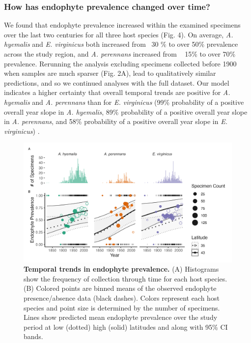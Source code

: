 \documentclass[11pt]{article}
\begin{document}
\subsubsection*{How has endophyte prevalence changed over time?}
We found that endophyte prevalence increased within the examined specimens over the last two centuries for all three host species (Fig. 4). 
On average, \emph{A. hyemalis} and \emph{E. virginicus} both increased from ~30 \% to over 50\% prevalence across the study region, and \emph{A. perennans} increased from ~ 15\% to over 70\% prevalence.
Rerunning the analysis excluding specimens collected before 1900 when samples are much sparser (Fig. 2A), lead to qualitatively similar predictions, and so we continued analyses with the full dataset. 
Our model indicates a higher certainty that overall temporal trends are positive for \emph{A. hyemalis} and \emph{A. perennans} than for \emph{E. virginicus} (99\% probability of a positive overall year slope in \emph{A. hyemalis}, 89\% probability of a positive overall year slope in \emph{A. perennans}, and 58\% probability of a positive overall year slope in \emph{E. virginicus}) .

\begin{figure}[H]
	\centering
	\includegraphics[width = \linewidth]{year_plot.png}
	\caption{\textbf{Temporal trends in endophyte prevalence.} (A) Histograms show the frequency of collection through time for each host species. (B) Colored points are binned means of the observed endophyte presence/absence data (black dashes). Colors represent each host species and point size is determined by the number of specimens. Lines show predicted mean endophyte prevalence over the study period at low (dotted) high (solid) latitudes and along with 95\% CI bands.}
\end{figure}
\end{document}
